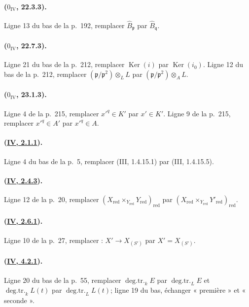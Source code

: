 \paragraph{($0_{\mathrm{IV}}$, 22.3.3).}
Ligne 13 du bas de la p.~192, remplacer $\widehat B_{\mathfrak p}$ par
$\widehat B_{\mathfrak q}$.

\paragraph{($0_{\mathrm{IV}}$, 22.7.3).}
Ligne 21 du bas de la p.~212, remplacer $\operatorname{Ker}(i)$ par
$\operatorname{Ker}(i_0)$. Ligne 12 du bas de la p.~212, remplacer
$(\mathfrak p/\mathfrak p^2)\otimes_L L$ par
$(\mathfrak p/\mathfrak p^2)\otimes_A L$.

\paragraph{($0_{\mathrm{IV}}$, 23.1.3).}
Ligne 4 de la p.~215, remplacer $x'^q\in K'$ par $x'\in K'$. Ligne 9
de la p.~215, remplacer $x'^q\in A'$ par $x'^q\in A$.

\paragraph{({\texorpdfstring{\protect\hyperref[canon-index.ega4.c04.statement.2-1-1]{IV, 2.1.1}}{IV, 2.1.1}}).}
Ligne 4 du bas de la p.~5, remplacer (III, 1.4.15.1) par
(III, 1.4.15.5).

\paragraph{({\texorpdfstring{\protect\hyperref[canon-index.ega4.c04.prop.2-4-3]{IV, 2.4.3}}{IV, 2.4.3}}).}
Ligne 12 de la p.~20, remplacer
$(X_{\mathrm{red}}\times_{Y_{\mathrm{red}}}Y_{\mathrm{red}})_{\mathrm{red}}$
par
$(X_{\mathrm{red}}\times_{Y_{\mathrm{red}}}Y'_{\mathrm{red}})_{\mathrm{red}}$.

\paragraph{({\texorpdfstring{\protect\hyperref[canon-index.ega4.c04.prop.2-6-1]{IV, 2.6.1}}{IV, 2.6.1}}).}
Ligne 10 de la p.~27, remplacer : $X'\to X_{(S')}$ par
$X'=X_{(S')}$. 

\paragraph{({\texorpdfstring{\protect\hyperref[canon-index.ega4.c04.prop.4-2-1]{IV, 4.2.1}}{IV, 4.2.1}}).}
Ligne 20 du bas de la p.~55, remplacer
$\operatorname{deg.tr.}_kE$ par $\operatorname{deg.tr.}_LE$ et
$\operatorname{deg.tr.}_kL(t)$ par $\operatorname{deg.tr.}_LL(t)$;
ligne 19 du bas, échanger « première » et « seconde ».

